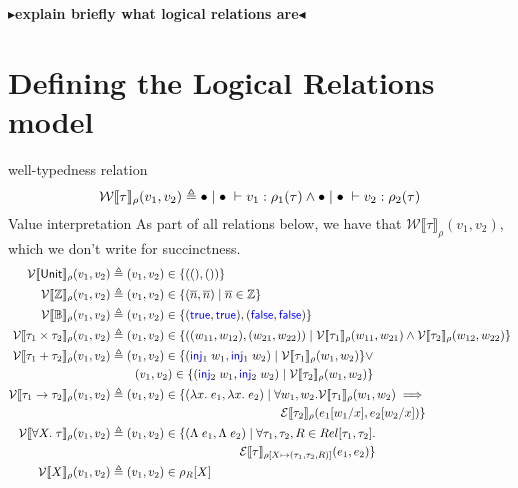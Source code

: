 \documentclass[twoside,11pt,openright]{report}
\theoremstyle{definition}
\newcommand{\Keyword}[1]{{\color{blue} \mathsf{#1}}}
\newcommand{\var}{x}
\newcommand{\expr}{e}
\newcommand{\val}{v}
\newcommand{\valB}{w}
\newcommand{\TT}{()}
\newcommand{\Num}[1]{\overline{#1}}
\newcommand{\True}{\Keyword{true}}
\newcommand{\False}{\Keyword{false}}
\newcommand{\Inj}[1]{\Keyword{inj}_{#1}\;}
\newcommand{\Tvar}{X}
\newcommand{\Tlam}{\Lambda\;}
\newcommand{\subst}[3]{#1{\left[#3 \middle/ #2 \right]}}
\newcommand{\Tunit}{\mathsf{Unit}}
\newcommand{\Tint}{\mathbb{Z}}
\newcommand{\Tbool}{\mathbb{B}}
\newcommand{\Tprod}[2]{#1 \times #2}
\newcommand{\Tsum}[2]{#1 + #2}
\newcommand{\Tfunc}[2]{#1 \rightarrow #2}
\newcommand{\Tall}[2]{\forall #1.\; #2}
\newcommand{\typ}{\tau}
\newcommand{\emptenv}{\bullet}
\newcommand{\empvenv}{\bullet}
\newcommand{\jdg}[4]{#1 \; | \; #2 \; \vdash #3 : #4}
\newcommand{\WtInp}[2]{\mathcal{W} \llbracket #1 \rrbracket_{#2}}
\newcommand{\WtInpGen}[2]{\WtInp{#1}{#2}(\val_1, \val_2)}
\newcommand{\ValInp}[2]{\mathcal{V} \llbracket #1 \rrbracket_{#2}}
\newcommand{\ValInpGen}[2]{\ValInp{#1}{#2}(\val_1, \val_2)}
\newcommand{\ExpInp}[2]{\mathcal{E} \llbracket #1 \rrbracket_{#2}}
\newcommand{\map}[2]{#1 \mapsto #2}
\newcommand{\todo}[1]{{\color[rgb]{.5,0,0}\textbf{$\blacktriangleright$#1$\blacktriangleleft$}}}
\begin{document}
\todo{explain briefly what logical relations are}

\section{Defining the Logical Relations model}
well-typedness relation
\begin{equation*}
  \WtInpGen{\typ}{\rho} \triangleq \jdg{\emptenv}{\empvenv}{\val_1}{\rho_1(\typ)} \land \jdg{\emptenv}{\empvenv}{\val_2}{\rho_2(\typ)}\\
\end{equation*}
Value interpretation
As part of all relations below, we have that $\WtInpGen{\typ}{\rho}$, which we don't write for succinctness.
\begin{align*}
  \ValInpGen{\Tunit}{\rho}  &\triangleq (\val_1, \val_2) \in \{(\TT, \TT)\}\\
  \ValInpGen{\Tint}{\rho}   &\triangleq (\val_1, \val_2) \in \{(\Num{n}, \Num{n}) \mid \Num{n} \in \Tint\}\\
  \ValInpGen{\Tbool}{\rho}  &\triangleq (\val_1, \val_2) \in \{(\True, \True), (\False, \False)\}\\
  \ValInpGen{\Tprod{\typ_1}{\typ_2}}{\rho}  &\triangleq (\val_1, \val_2) \in \{((\valB_{11}, \valB_{12}), (\valB_{21}, \valB_{22})) \mid \ValInp{\typ_1}{\rho}(\valB_{11}, \valB_{21}) \land \ValInp{\typ_2}{\rho}(\valB_{12}, \valB_{22})\}\\
  \ValInpGen{\Tsum{\typ_1}{\typ_2}}{\rho}   &\triangleq 
  \begin{aligned}[t]
    (\val_1, \val_2) \in \{(\Inj{1} \valB_1, \Inj{1} \valB_2) \mid \ValInp{\typ_1}{\rho}(\valB_1, \valB_2)\} \lor \\
    (\val_1, \val_2) \in \{(\Inj{2} \valB_1, \Inj{2} \valB_2) \mid \ValInp{\typ_2}{\rho}(\valB_1, \valB_2)\}
  \end{aligned}\\
  \ValInpGen{\Tfunc{\typ_1}{\typ_2}}{\rho}  &\triangleq 
  \begin{aligned}[t]
    (\val_1, \val_2) \in \{(\fun \var . \expr_1, \fun \var . \expr_2) \mid \forall \valB_1, \valB_2 . \ValInp{\typ_1}{\rho}(\valB_{1}, \valB_{2}) \implies\\
    \ExpInp{\typ_2}{\rho}(\subst{\expr_1}{\var}{\valB_1}, \subst{\expr_2}{\var}{\valB_2})\}
  \end{aligned}\\
  \ValInpGen{\Tall{\Tvar}{\typ}}{\rho}  &\triangleq 
  \begin{aligned}[t]
    (\val_1, \val_2) \in \{(\Tlam \expr_1, \Tlam \expr_2) \mid \forall \typ_1, \typ_2, R \in Rel[\typ_1, \typ_2] .\\
    \ExpInp{\typ}{\rho[\map{\Tvar}{(\typ_1, \typ_2, R)}]}(\expr_1, \expr_2)\}
  \end{aligned}\\
  \ValInpGen{\Tvar}{\rho} &\triangleq (\val_1, \val_2) \in \rho_R[\Tvar]\\
\end{align*}
\end{document}
